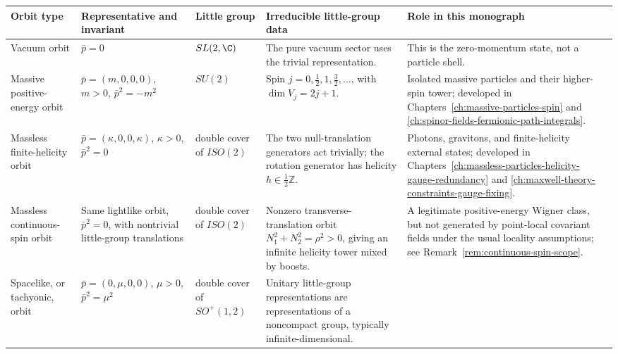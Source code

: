 \begin{table}[H]
  \centering
  \scriptsize
  \renewcommand{\arraystretch}{1.25}
  \setlength{\tabcolsep}{2pt}
  \begin{tabular}{|
    >{\raggedright\arraybackslash}p{}|
    >{\raggedright\arraybackslash}p{}|
    >{\raggedright\arraybackslash}p{}|
    >{\raggedright\arraybackslash}p{}|
    >{\raggedright\arraybackslash}p{}|}
    \hline
    Orbit type & Representative and invariant & Little group & Irreducible
    little-group data & Role in this monograph \\
    \hline
    Vacuum orbit &
    \(\bar p=0\) &
    \(SL(2,\C)\) &
    The pure vacuum sector uses the trivial representation. &
    This is the zero-momentum state, not a particle shell. \\
    \hline
    Massive positive-energy orbit &
    \(\bar p=(m,0,0,0)\), \(m>0\), \(\bar p^2=-m^2\) &
    \(SU(2)\) &
    Spin \(j=0,\frac12,1,\frac32,\ldots\), with
    \(\dim V_j=2j+1\). &
    Isolated massive particles and their higher-spin tower; developed in
    Chapters~\ref{ch:massive-particles-spin} and
    \ref{ch:spinor-fields-fermionic-path-integrals}. \\
    \hline
    Massless finite-helicity orbit &
    \(\bar p=(\kappa,0,0,\kappa)\), \(\kappa>0\), \(\bar p^2=0\) &
    double cover of \(ISO(2)\) &
    The two null-translation generators act trivially; the rotation generator
    has helicity \(h\in\frac12\mathbb Z\). &
    Photons, gravitons, and finite-helicity external states; developed in
    Chapters~\ref{ch:massless-particles-helicity-gauge-redundancy} and
    \ref{ch:maxwell-theory-constraints-gauge-fixing}. \\
    \hline
    Massless continuous-spin orbit &
    Same lightlike orbit, \(\bar p^2=0\), with nontrivial little-group
    translations &
    double cover of \(ISO(2)\) &
    Nonzero transverse-translation orbit
    \(N_1^2+N_2^2=\rho^2>0\), giving an infinite helicity tower mixed by
    boosts. &
    A legitimate positive-energy Wigner class, but not generated by
    point-local covariant fields under the usual locality assumptions; see
    Remark~\ref{rem:continuous-spin-scope}. \\
    \hline
    Spacelike, or tachyonic, orbit &
    \(\bar p=(0,\mu,0,0)\), \(\mu>0\), \(\bar p^2=\mu^2\) &
    double cover of \(SO^+(1,2)\) &
    Unitary little-group representations are representations of a noncompact
    group, typically infinite-dimensional. &

\end{tabular}
\end{table}
